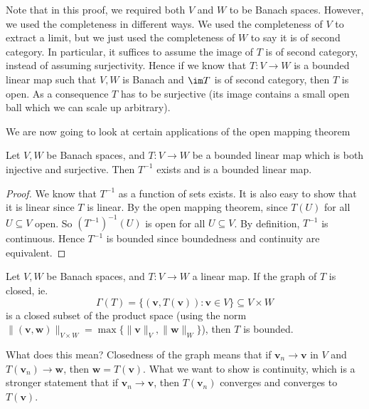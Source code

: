 \documentclass[a4paper]{article}
\begin{document}
Note that in this proof, we required both $V$ and $W$ to be Banach spaces. However, we used the completeness in different ways. We used the completeness of $V$ to extract a limit, but we just used the completeness of $W$ to say it is of second category. In particular, it suffices to assume the image of $T$ is of second category, instead of assuming surjectivity. Hence if we know that $T: V\to W$ is a bounded linear map such that $V, W$ is Banach and $\im T$ is of second category, then $T$ is open. As a consequence $T$ has to be surjective (its image contains a small open ball which we can scale up arbitrary).

We are now going to look at certain applications of the open mapping theorem
\begin{thm}
  Let $V, W$ be Banach spaces, and $T: V\to W$ be a bounded linear map which is both injective and surjective. Then $T^{-1}$ exists and is a bounded linear map.
\end{thm}

\begin{proof}
  We know that $T^{-1}$ as a function of sets exists. It is also easy to show that it is linear since $T$ is linear. By the open mapping theorem, since $T(U)$ for all $U \subseteq V$ open. So $(T^{-1})^{-1}(U)$ is open for all $U\subseteq V$. By definition, $T^{-1}$ is continuous. Hence $T^{-1}$ is bounded since boundedness and continuity are equivalent.
\end{proof}

\begin{thm}
  Let $V, W$ be Banach spaces, and $T: V\to W$ a linear map. If the graph of $T$ is closed, ie.
  \[
    \Gamma(T) = \{(\mathbf{v}, T(\mathbf{v})): \mathbf{v}\in V\} \subseteq V\times W
  \]
  is a closed subset of the product space (using the norm $\|(\mathbf{v}, \mathbf{w})\|_{V\times W} = \max \{\|\mathbf{v}\|_V, \|\mathbf{w}\|_W\}$), then $T$ is bounded.
\end{thm}
What does this mean? Closedness of the graph means that if $\mathbf{v}_n \to \mathbf{v}$ in $V$ and $T (\mathbf{v}_n) \to \mathbf{w}$, then $\mathbf{w} = T(\mathbf{v})$. What we want to show is continuity, which is a stronger statement that if $\mathbf{v}_n \to \mathbf{v}$, then $T(\mathbf{v}_n)$ converges and converges to $T(\mathbf{v})$.
\end{document}
